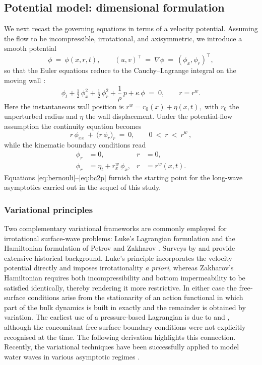 \documentclass[alpha-refs, 12pt]{wiley-article}
\begin{document}
\subsection{Potential model: dimensional formulation}

We next recast the governing equations in terms of a velocity potential. Assuming the flow to be incompressible, irrotational, and axisymmetric, we introduce a smooth potential
\[
  \phi\ =\ \phi(x,r,t),\qquad
  (u,v)^{\top}\ =\ \nabla\phi\ =\ (\phi_{x},\phi_{r})^{\top},
\]
so that the Euler equations reduce to the Cauchy--Lagrange integral on the moving wall \citep{Mitsotakis2019}:
\begin{equation}\label{eq:bernouli}
  \phi_{t}
  +\tfrac{1}{2}\,\phi_{x}^{2}
  +\tfrac{1}{2}\,\phi_{r}^{2}
  +\frac{1}{\rho}\,p
  +\kappa\,\phi
  \;=\;0,
  \qquad
  r=r^{w}.
\end{equation}
Here the instantaneous wall position is
\(
  r^{w}=r_{0}(x)+\eta(x,t),
\)
with $r_{0}$ the unperturbed radius and $\eta$ the wall displacement. Under the potential-flow assumption the continuity equation becomes
\begin{equation}\label{eq:massp}
  r\,\phi_{xx}\ +\ \bigl(r\,\phi_{r}\bigr)_{r}\ =\ 0, \qquad 0\ <\ r\ <\ r^{w}\,,
\end{equation}
while the kinematic boundary conditions read
\begin{align}
  \phi_{r}&=0,
  & r&=0, \label{eq:bc1p}\\[2pt]
  \phi_{r}&=\eta_{t}+r^{w}_{x}\,\phi_{x},
  & r&=r^{w}(x,t).\label{eq:bc2p}
\end{align}
Equations \eqref{eq:bernouli}--\eqref{eq:bc2p} furnish the starting point for the long-wave asymptotics carried out in the sequel of this study.

\subsubsection{Variational principles}
\label{sec:var_principles}

Two complementary variational frameworks are commonly employed for irrotational surface-wave problems: Luke's Lagrangian formulation \citep{Luke1967} and the Hamiltonian formulation of Petrov and Zakharov \citep{Petrov1964, Zakharov1968}. Surveys by \cite{Radder1999} and \cite{Zakharov1997} provide extensive historical background. Luke's principle incorporates the velocity potential directly and imposes irrotationality \emph{a priori}, whereas Zakharov's Hamiltonian requires both incompressibility and bottom impermeability to be satisfied identically, thereby rendering it more restrictive. In either case the free‐surface conditions arise from the stationarity of an action functional in which part of the bulk dynamics is built in exactly and the remainder is obtained by variation. The earliest use of a pressure‐based Lagrangian is due to \cite{Clebsch1859} and \cite{Hargreaves1908}, although the concomitant free‐surface boundary conditions were not explicitly recognised at the time. The following derivation highlights this connection. Recently, the variational techniques have been successfully applied to model water waves in various asymptotic regimes \citep{Clamond2009,Clamond2024}.
\end{document}

